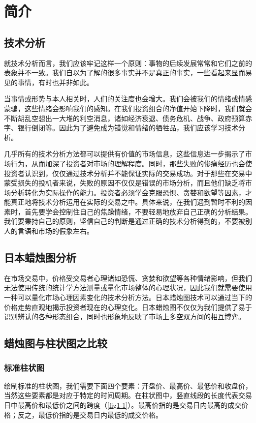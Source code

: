 \chapter{简介}
\section{技术分析}
就技术分析而言，我们应该牢记这样一个原则：事物的后续发展常常和它们之前的表象并不一致。我们自以为了解的很多事实并不是真正的事实，一些看起来显而易见的事情，有时也并非如此。

当事情或形势与本人相关时，人们的关注度也会增大。我们会被我们的情绪或情感蒙骗，这些情绪会影响我们的感知。在我们投资组合的净值开始下降时，我们就会不断胡乱空想出一大堆的利空消息，诸如经济衰退、债务危机、战争、政府预算赤字、银行倒闭等。因此为了避免成为错觉和情绪的牺牲品，我们应该学习技术分析。

几乎所有的技术分析方法都可以提供有价值的市场信息，这些信息进一步揭示了市场行为，从而加深了投资者对市场的理解程度。同时，那些失败的惨痛经历也会使投资者认识到，仅仅通过技术分析并不能保证实际的交易成功。对于那些在交易中蒙受损失的投机者来说，失败的原因不仅仅是错误的市场分析，而且他们缺乏将市场分析转化为实际操作的能力。投资者必须学会克服恐惧、贪婪和欲望等因素，才能真正地将技术分析运用在实际的交易之中。具体来说，在我们遇到暂时不利的因素时，首先要学会控制住自己的焦躁情绪，不要轻易地放弃自己正确的分析结果。我们要秉持自己的原则，坚信自己的判断是通过正确的技术分析得到的，不要被别人的言语和市场的假象左右。
\section{日本蜡烛图分析}
在市场交易中，价格受交易者心理诸如恐慌、贪婪和欲望等各种情绪影响，但我们无法使用传统的统计学方法测量或量化市场整体的心理状况，因此我们就需要使用一种可以量化市场心理因素变化的技术分析方法。日本蜡烛图技术可以通过当下的价格走势直观地揭示投资者现在的心理变化。日本蜡烛图不仅仅为我们提供了易于识别辨认的各种形态组合，同时也形象地反映了市场上多空双方间的相互博弈。
\section{蜡烛图与柱状图之比较}
\subsection*{标准柱状图}
绘制标准的柱状图，我们需要下面四个要素：开盘价、最高价、最低价和收盘价，当然这些要素都是对应于特定的时间周期。在柱状图中，竖直线段的长度代表交易日中最高价和最低价之间的跨度（\autoref{fig1-1}）。最高价指的是交易日内最高的成交价格；反之，最低价指的是交易日内最低的成交价格。